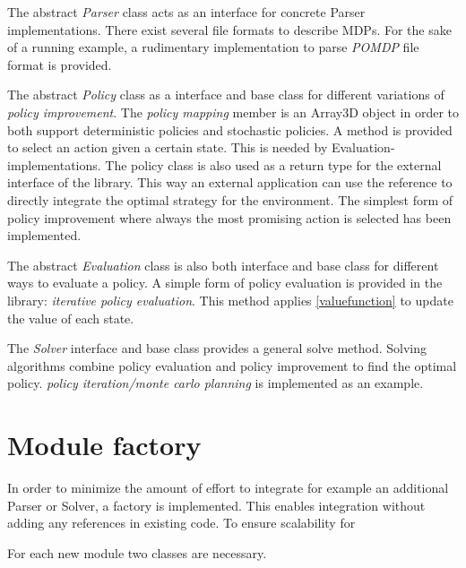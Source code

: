 The abstract \emph{Parser} class acts as an interface for concrete Parser implementations. There exist several file formats to describe MDPs. For the sake of a running example, a rudimentary implementation to parse \emph{POMDP} file format \autocite{Cassandra} is provided. 

The abstract \emph{Policy} class as a interface and base class for different variations of \emph{policy improvement}. The \emph{policy mapping } member is an Array3D object in order to both support deterministic policies and stochastic policies. A method is provided to select an action given a certain state. This is needed by Evaluation-implementations. The policy class is also used as a return type for the external interface of the library. This way an external application can use the reference to directly integrate the optimal strategy for the environment. 
The simplest form of policy improvement where always the most promising action is selected has been implemented. 

The abstract \emph{Evaluation} class is also both interface and base class for different ways to evaluate a policy. A simple form of policy evaluation is provided in the library: \emph{iterative policy evaluation}. This method applies \autoref{valuefunction} to update the value of each state. 

The \emph{Solver} interface and base class provides a general solve method. Solving algorithms combine policy evaluation and policy improvement to find the optimal policy. \emph{policy iteration/monte carlo planning} is implemented as an example.

\section{Module factory}
\label{integration}

In order to minimize the amount of effort to integrate for example an additional Parser or Solver, a factory is implemented. This enables integration without adding any references in existing code. To ensure scalability for 

For each new module two classes are necessary.


%

